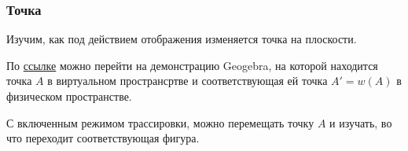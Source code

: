 \begin{frame}\frametitle{Точка}
  Изучим, как под действием отображения изменяется точка на плоскости.

  По \href{https://www.geogebra.org/m/dncbzxhp}{ссылке} можно перейти на
  демонстрацию Geogebra, на которой находится точка \(A\) в виртуальном пространсртве
  и соответствующая ей точка \(A' = w(A)\) в физическом пространстве. 
  
  С включенным режимом трассировки, можно перемещать точку \(A\) и 
  изучать, во что переходит соответствующая фигура.
\end{frame}


